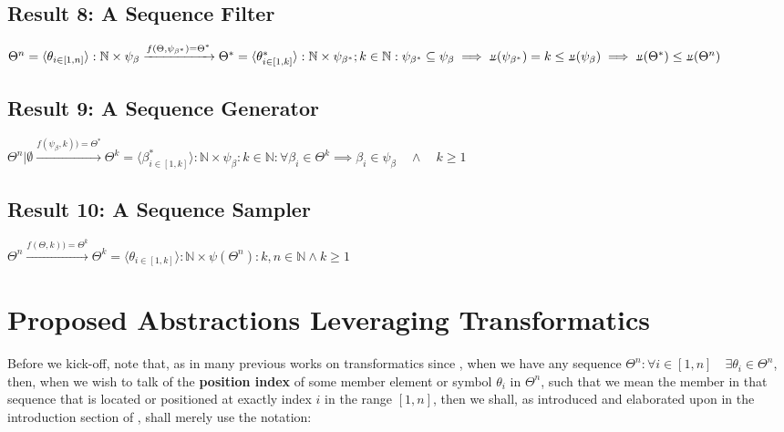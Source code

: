\documentclass[12pt,a4paper]{article}
\newcommand{\invpi}[1]{\mathop{\rotatebox[origin=c]{180}{$\pi$}}#1}
\begin{document}
\subsection{Result 8: A Sequence Filter\cite{transformatics}}

$\Theta^n = \langle \theta_{i \in [1,n]} \rangle : \mathbb{N} \times \psi_\beta \xrightarrow{f(\Theta,\psi_{\beta^*})=\Theta^*} \Theta^* = \langle \theta^*_{i \in [1,k]} \rangle : \mathbb{N} \times \psi_{\beta^*} ;\\ k \in \mathbb{N} : \psi_{\beta^*} \subseteq \psi_\beta \implies \invpi(\psi_{\beta^*}) = k \leq \invpi(\psi_\beta) \implies \invpi(\Theta^*) \leq \invpi(\Theta^n) $

\subsection{Result 9: A Sequence Generator\cite{transformatics}\cite{lutalo2025transformatic}}

$\Theta^n | \emptyset \xrightarrow{f(\psi_\beta,k))=\Theta^*} \Theta^k = \langle \beta^*_{i \in [1,k]} \rangle : \mathbb{N} \times \psi_{\beta} : k \in \mathbb{N} : \forall \beta_i \in \Theta^k \implies \beta_i \in \psi_\beta \quad \land \quad k \geq 1 $

\subsection{Result 10: A Sequence Sampler\cite{lutalo_2025_trans_genetics}}

$\Theta^n \xrightarrow{f(\Theta,k))=\Theta^k} \Theta^k = \langle \theta_{i \in [1,k]} \rangle : \mathbb{N} \times \psi(\Theta^n) : k,n \in \mathbb{N} \land k \geq 1$




\section{Proposed Abstractions Leveraging Transformatics}

Before we kick-off, note that, as in many previous works on transformatics since \cite{transformatics}, when we have any sequence $\Theta^n : \forall i \in [1,n] \quad \exists \theta_i \in \Theta^n$, then, when we wish to talk of the \textbf{position index} of some member element or symbol $\theta_i$ in $\Theta^n$, such that we mean the member in that sequence that is located or positioned at exactly index $i$ in the range $[1,n]$, then we shall, as introduced and elaborated upon in the introduction section of \cite{transformatics}, shall merely use the notation:\\
\end{document}
